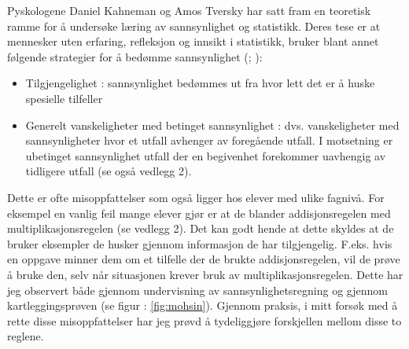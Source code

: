 \documentclass[main.tex]{subfiles}
\begin{document}
Pyskologene Daniel Kahneman og Amos Tversky har satt fram en teoretisk 
ramme for å undersøke læring av sannsynlighet og statistikk. Deres tese er at mennesker uten erfaring, refleksjon og 
innsikt i statistikk, bruker blant annet følgende strategier for å bedømme sannsynlighet (; 
):
\begin{itemize}
\item Tilgjengelighet : sannsynlighet bedømmes ut fra hvor lett det er å huske spesielle tilfeller
\item Generelt vanskeligheter med betinget sannsynlighet : dvs. vanskeligheter med sannsynligheter hvor et utfall
avhenger av foregående utfall. I motsetning er ubetinget sannsynlighet utfall der en begivenhet forekommer uavhengig 
av tidligere utfall (se også vedlegg 2). 
\end{itemize}
Dette er ofte misoppfattelser som også ligger hos elever med ulike fagnivå. For eksempel en vanlig feil
mange elever gjør er at de blander addisjonsregelen med multiplikasjonsregelen (se vedlegg 2). Det kan godt hende 
at dette skyldes at de bruker eksempler de husker gjennom informasjon de har tilgjengelig. F.eks. hvis en oppgave 
minner dem om et tilfelle der de brukte addisjonsregelen, vil de prøve å bruke den, selv når situasjonen krever bruk
av multiplikasjonsregelen. Dette har jeg observert både gjennom undervisning av sannsynlighetsregning og
gjennom kartleggingsprøven (se figur : \ref{fig:mohsin}). Gjennom praksis, i mitt forsøk med å rette disse 
misoppfattelser har jeg prøvd å tydeliggjøre forskjellen mellom disse to reglene. 
\end{document}
